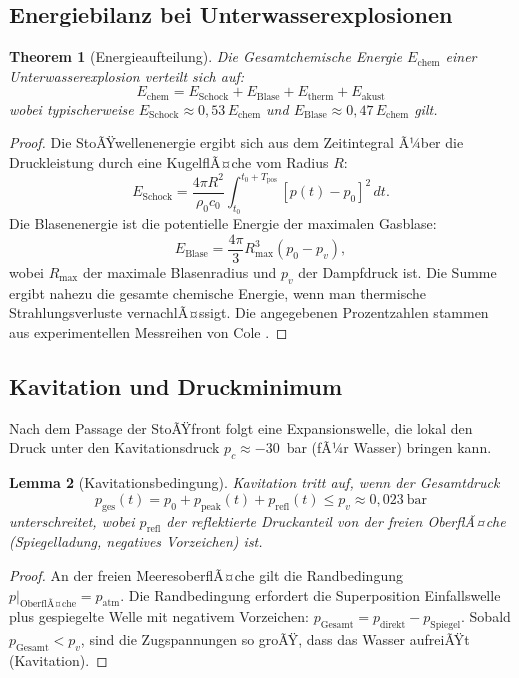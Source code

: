 ﻿\documentclass[12pt,a4paper]{article}
\newtheorem{theorem}{Theorem}[section]
\newtheorem{lemma}[theorem]{Lemma}
\theoremstyle{definition}
\theoremstyle{remark}
\begin{document}
\subsection{Energiebilanz bei Unterwasserexplosionen}

\begin{theorem}[Energieaufteilung]
\label{thm:energie_aufteilung}
Die Gesamtchemische Energie $E_{\text{chem}}$ einer Unterwasserexplosion verteilt sich auf:
\begin{equation}
E_{\text{chem}} = E_{\text{Schock}} + E_{\text{Blase}} + E_{\text{therm}} + E_{\text{akust}}
\end{equation}
wobei typischerweise $E_{\text{Schock}} \approx 0{,}53\,E_{\text{chem}}$ und $E_{\text{Blase}} \approx 0{,}47\,E_{\text{chem}}$ gilt.
\end{theorem}
\begin{proof}
Die StoÃŸwellenenergie ergibt sich aus dem Zeitintegral Ã¼ber die Druckleistung durch eine KugelflÃ¤che vom Radius $R$:
\begin{equation}
E_{\text{Schock}} = \frac{4\pi R^2}{\rho_0 c_0}\int_{t_0}^{t_0+T_{\text{pos}}} [p(t) - p_0]^2\,dt.
\end{equation}
Die Blasenenergie ist die potentielle Energie der maximalen Gasblase:
\begin{equation}
E_{\text{Blase}} = \frac{4\pi}{3} R_{\max}^3 (p_0 - p_v),
\end{equation}
wobei $R_{\max}$ der maximale Blasenradius und $p_v$ der Dampfdruck ist. Die Summe ergibt nahezu die gesamte chemische Energie, wenn man thermische Strahlungsverluste vernachlÃ¤ssigt. Die angegebenen Prozentzahlen stammen aus experimentellen Messreihen von Cole \cite{cole1948}. 
\end{proof}

\subsection{Kavitation und Druckminimum}

Nach dem Passage der StoÃŸfront folgt eine Expansionswelle, die lokal den Druck unter den Kavitationsdruck $p_c \approx -30$~bar (fÃ¼r Wasser) bringen kann.

\begin{lemma}[Kavitationsbedingung]
\label{lem:kavitation}
Kavitation tritt auf, wenn der Gesamtdruck
\begin{equation}
p_{\text{ges}}(t) = p_0 + p_{\text{peak}}(t) + p_{\text{refl}}(t) \leq p_v \approx 0{,}023~\text{bar}
\end{equation}
unterschreitet, wobei $p_{\text{refl}}$ der reflektierte Druckanteil von der freien OberflÃ¤che (Spiegelladung, negatives Vorzeichen) ist.
\end{lemma}
\begin{proof}
An der freien MeeresoberflÃ¤che gilt die Randbedingung $p|_{\text{OberflÃ¤che}} = p_{\text{atm}}$. Die Randbedingung erfordert die Superposition Einfallswelle plus gespiegelte Welle mit negativem Vorzeichen: $p_{\text{Gesamt}} = p_{\text{direkt}} - p_{\text{Spiegel}}$. Sobald $p_{\text{Gesamt}} < p_v$, sind die Zugspannungen so groÃŸ, dass das Wasser aufreiÃŸt (Kavitation). 
\end{proof}
\end{document}
